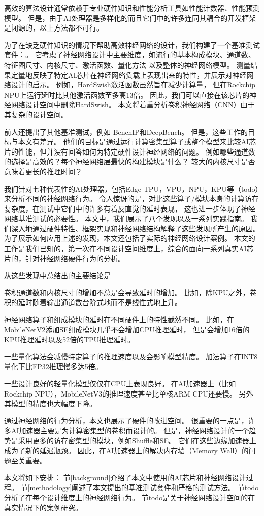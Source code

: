 高效的算法设计通常依赖于专业硬件知识和性能分析工具如性能计数器、性能预测模型。
但是，由于AI处理器是多样化的而且它们中的许多连同其耦合的开发框架是闭源的，以上方法都不可行。

为了在缺乏硬件知识的情况下帮助高效神经网络的设计，我们构建了一个基准测试套件：\sysname。
它考虑了神经网络设计中主要维度，如流行的基本构成模块、通道数、特征图尺寸、内核尺寸、激活函数、量化方法
以及整体的神经网络模型。
测量结果定量地反映了特定AI芯片在神经网络负载上表现出来的特性，并展示对神经网络设计的启示。
例如，HardSwish\cite{howard2019searching}激活函数虽然旨在减少计算量，
但在Rockchip NPU\cite{rk3399pro}上运行延时比其他激活函数至多高13倍。
因此，我们可以直接在该芯片的神经网络设计空间中删除HardSwish。
本文将着重分析卷积神经网络（CNN）由于其复杂的设计空间。

前人还提出了其他基准测试，例如
BenchIP\cite{tao2017benchip}和DeepBench\cite{deepbench}。
但是，这些工作的目标与本文有差异。
他们的目标是通过运行计算密集型算子或整个模型来比较AI芯片的性能，但并没有回答如何为特定硬件设计神经网络的问题。
例如哪些通道数的选择是高效的？每个神经网络层最快的构建模块是什么？
较大的内核尺寸是否意味着更长的推理时间？

我们针对七种代表性的AI处理器，包括Edge TPU，VPU，NPU，KPU等（todo）来分析不同的神经网络行为。
令人惊讶的是，对比这些算子/模块本身的计算访存复杂度，在测试中它们中的许多有着反直觉的延时表现，
这也进一步体现了神经网络基准测试的必要性。
本文中，我们展示了八个发现以及一系列实践指南。
我们深入地通过硬件特性、框架实现和神经网络结构解释了这些发现所产生的原因。
为了展示如何应用上述的发现，本文还包括了实际的神经网络设计案例。
本文的工作是我们已知的，第一次在不同设计空间维度上，综合的面向一系列真实AI芯片的，针对神经网络硬件行为的分析。

从这些发现中总结出的主要结论是
\begin{enumerate*}
    \item 卷积通道数和内核尺寸的增加不总是会导致延时的增加。
    比如，除KPU之外，卷积的延时随着输出通道数台阶式地而不是线性式地上升。
    \item 神经网络算子和组成模块的延时在不同硬件上的特性截然不同。
    比如，在MobileNetV2添加SE\cite{hu2018squeeze}组成模块几乎不会增加CPU推理延时，
    但是会增加16倍的KPU推理延时以及52倍的TPU推理延时。
    \item 一些量化算法会减慢特定算子的推理速度以及会影响模型精度。
    加法算子在INT8量化下比FP32推理慢多达5倍。
    \item 一些设计良好的轻量化模型仅仅在CPU上表现良好。
    在AI加速器上（比如Rockchip NPU），MobileNetV3的推理速度甚至比单核ARM CPU还要慢。
    另外其模型的精度也大幅度下降。
\end{enumerate*}

通过神经网络的行为分析，本文也展示了硬件的改进空间。
很重要的一点是，许多AI加速器主要是为计算密集型的卷积而设计的。
但是，神经网络设计的一个趋势是采用更多的访存密集型的模块，例如Shuffle和SE。
它们在这些边缘加速器上成为了新的延迟瓶颈。
因此，在AI加速器上的解决内存墙（Memory Wall）的问题至关重要。

本文将如下安排：
节\ref{background}介绍了本文中使用的AI芯片和神经网络设计过程。
节\ref{methodology}阐述了本文提出的基准测试套件和严格的测试方法。
节todo分析了在每个设计维度上的神经网络行为。
节todo是关于神经网络设计空间的在真实情况下的案例研究。
